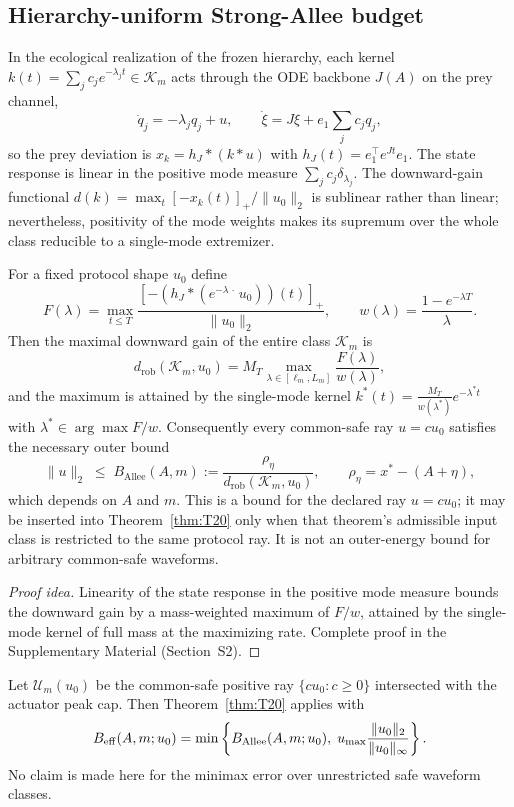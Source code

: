 \subsection{Hierarchy-uniform Strong-Allee budget}
\label{subsec:allee_uniform}

In the ecological realization of the frozen hierarchy, each kernel $k(t)=\sum_j c_j e^{-\lambda_j t}\in\mathcal K_m$ acts through the ODE backbone $J(A)$ on the prey channel,
\[
\dot q_j = -\lambda_j q_j + u, \qquad \dot\xi = J\xi + e_1\sum_j c_j q_j,
\]
so the prey deviation is $x_k = h_J*(k*u)$ with $h_J(t)=e_1^\top e^{Jt}e_1$.  The state response is linear in the positive mode measure $\sum_j c_j\delta_{\lambda_j}$. The downward-gain functional $d(k)=\max_t[-x_k(t)]_+/\|u_0\|_2$ is sublinear rather than linear; nevertheless, positivity of the mode weights makes its supremum over the whole class reducible to a single-mode extremizer.

\begin{theorem}
\label{thm:T22}
For a fixed protocol shape $u_0$ define
\[
F(\lambda)=\max_{t\le T}\frac{[-(h_J*(e^{-\lambda\,\cdot\,}u_0))(t)]_+}{\|u_0\|_2},
\qquad
w(\lambda)=\frac{1-e^{-\lambda T}}{\lambda}.
\]
Then the maximal downward gain of the entire class $\mathcal K_m$ is
\[
d_{\mathrm{rob}}(\mathcal K_m,u_0)
= M_T\max_{\lambda\in[\ell_m,L_m]}\frac{F(\lambda)}{w(\lambda)},
\]
and the maximum is attained by the single-mode kernel $k^*(t)=\frac{M_T}{w(\lambda^*)}e^{-\lambda^* t}$ with $\lambda^*\in\arg\max F/w$.  Consequently every common-safe ray $u=c u_0$ satisfies the necessary outer bound
\[
\|u\|_2 \;\le\; B_{\mathrm{Allee}}(A,m):=\frac{\rho_\eta}{d_{\mathrm{rob}}(\mathcal K_m,u_0)},
\qquad \rho_\eta = x^*-(A+\eta),
\]
which depends on $A$ and $m$. This is a bound for the declared ray $u=c u_0$; it may be inserted into Theorem~\ref{thm:T20} only when that theorem's admissible input class is restricted to the same protocol ray. It is not an outer-energy bound for arbitrary common-safe waveforms.
\end{theorem}
\begin{proof}[Proof idea]
Linearity of the state response in the positive mode measure bounds the downward gain by a mass-weighted maximum of $F/w$, attained by the single-mode kernel of full mass at the maximizing rate. Complete proof in the Supplementary Material (Section~S2).
\end{proof}

\begin{corollary}
\label{cor:pulse_testing}
Let $\mathcal U_m(u_0)$ be the common-safe positive ray $\{c u_0:c\ge0\}$ intersected with the actuator peak cap. Then Theorem~\ref{thm:T20} applies with
\[
B_{\rm eff}(A,m;u_0)=\min\left\{B_{\rm Allee}(A,m;u_0),\;u_{\max}\frac{\|u_0\|_2}{\|u_0\|_\infty}\right\}.
\]
No claim is made here for the minimax error over unrestricted safe waveform classes.
\end{corollary}

